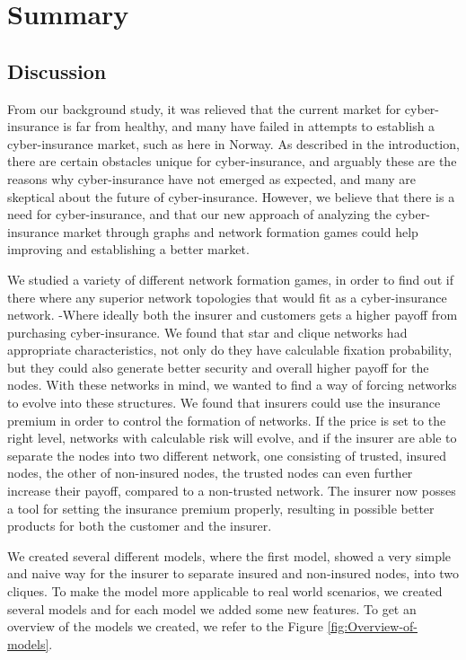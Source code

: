 \chapter{Summary}
\section{Discussion}
From our background study, it was relieved that the current market for cyber-insurance is far from healthy, and many have failed in attempts to establish a cyber-insurance market, such as here in Norway. As described in the introduction, there are certain obstacles unique for cyber-insurance, and arguably these are the reasons why cyber-insurance have not emerged as expected, and many are skeptical about the future of cyber-insurance.  However, we believe that there is a need for cyber-insurance, and that our new approach of analyzing the cyber-insurance market through graphs and network formation games could help improving and establishing a better market.   

We studied a variety of different network formation games, in order to find out if there where any superior network topologies that would fit as a cyber-insurance network. -Where ideally both the insurer and customers gets a higher payoff from purchasing cyber-insurance. We found that star and clique networks had appropriate characteristics, not only do they have calculable fixation probability, but they could also generate better security and overall higher payoff for the nodes. With these networks in mind, we wanted to find a way of forcing networks to evolve into these structures.  We found that insurers could use the insurance premium in order to control the formation of networks. If the price is set to the right level, networks with calculable risk will evolve, and if the insurer are able to separate the nodes into two different network, one consisting of trusted, insured nodes, the other of non-insured nodes, the trusted nodes can even further increase their payoff, compared to a non-trusted network. The insurer now posses a tool for setting the insurance premium properly, resulting in possible better products for both the customer and the insurer.

We created several different models, where the first model, showed a very simple and naive way for the insurer to separate insured and non-insured nodes, into two cliques. To make the model more applicable to real world scenarios, we created several models and for each model we added some new features. To get an overview of the models we created, we refer to the Figure \ref{fig:Overview-of-models}. 

